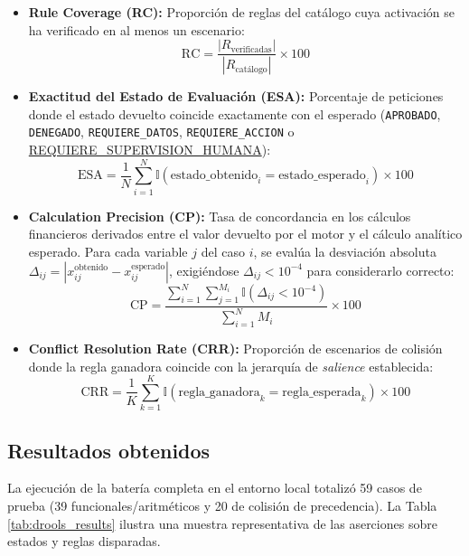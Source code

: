 \documentclass[12pt,a4paper]{report}
\begin{document}
\begin{itemize}
    \item \textbf{Rule Coverage (RC):} Proporción de reglas del catálogo cuya activación se ha verificado en al menos un escenario:
    $$\text{RC} = \frac{|R_{\text{verificadas}}|}{|R_{\text{catálogo}}|} \times 100$$
    
    \item \textbf{Exactitud del Estado de Evaluación (ESA):} Porcentaje de peticiones donde el estado devuelto coincide exactamente con el esperado (\texttt{APROBADO}, \texttt{DENEGADO}, \texttt{REQUIERE\_DATOS}, \texttt{REQUIERE\_ACCION} o \url{REQUIERE\_SUPERVISION\_HUMANA}):
    $$\text{ESA} = \frac{1}{N} \sum_{i=1}^{N} \mathbb{I}(\text{estado\_obtenido}_i = \text{estado\_esperado}_i) \times 100$$
    
    \item \textbf{Calculation Precision (CP):} Tasa de concordancia en los cálculos financieros derivados entre el valor devuelto por el motor y el cálculo analítico esperado. Para cada variable $j$ del caso $i$, se evalúa la desviación absoluta $\Delta_{ij} = |x_{ij}^{\text{obtenido}} - x_{ij}^{\text{esperado}}|$, exigiéndose $\Delta_{ij} < 10^{-4}$ para considerarlo correcto:
    $$\text{CP} = \frac{\sum_{i=1}^{N} \sum_{j=1}^{M_i} \mathbb{I}(\Delta_{ij} < 10^{-4})}{\sum_{i=1}^{N} M_i} \times 100$$
    
    \item \textbf{Conflict Resolution Rate (CRR):} Proporción de escenarios de colisión donde la regla ganadora coincide con la jerarquía de \textit{salience} establecida:
    $$\text{CRR} = \frac{1}{K} \sum_{k=1}^{K} \mathbb{I}(\text{regla\_ganadora}_k = \text{regla\_esperada}_k) \times 100$$
\end{itemize}

\subsection{Resultados obtenidos}

La ejecución de la batería completa en el entorno local totalizó 59 casos de prueba (39 funcionales/aritméticos y 20 de colisión de precedencia). La Tabla \ref{tab:drools_results} ilustra una muestra representativa de las aserciones sobre estados y reglas disparadas.
\end{document}
